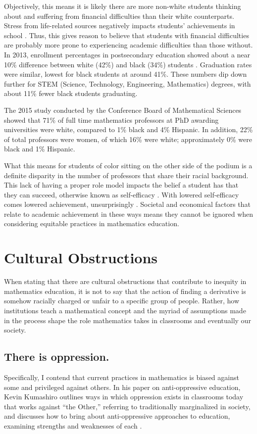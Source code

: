 Objectively, this means it is likely there are more non-white students thinking about and suffering from financial difficulties than their white counterparts. Stress from life-related sources negatively impacts students' achievements in school \citep{andrews_relation_2004}. Thus, this gives reason to believe that students with financial difficulties are probably more prone to experiencing academic difficulties than those without. In 2013, enrollment percentages in postsecondary education showed about a near 10\% difference between white (42\%) and black (34\%) students \citep{musu-gillette_status_nodate}. Graduation rates were similar, lowest for black students at around 41\%. These numbers dip down further for STEM (Science, Technology, Engineering, Mathematics) degrees, with about 11\% fewer black students graduating.

The 2015 study conducted by the Conference Board of Mathematical Sciences showed that 71\% of full time mathematics professors at PhD awarding universities were white, compared to 1\% black and 4\% Hispanic. In addition, 22\% of total professors were women, of which 16\% were white; approximately 0\% were black and 1\% Hispanic.

What this means for students of color sitting on the other side of the podium is a definite disparity in the number of professors that share their racial background. This lack of having a proper role model impacts the belief a student has that they can succeed, otherwise known as self-efficacy \citep{thevenin_mentors_2007}. With lowered self-efficacy comes lowered achievement, unsurprisingly \citep{motlagh_relationship_2011}. Societal and economical factors that relate to academic achievement in these ways means they cannot be ignored when considering equitable practices in mathematics education.

\section{Cultural Obstructions}
When stating that there are cultural obstructions that contribute to inequity in mathematics education, it is not to say that the action of finding a derivative is somehow racially charged or unfair to a specific group of people. Rather, how institutions teach a mathematical concept and the myriad of assumptions made in the process shape the role mathematics takes in classrooms and eventually our society.

\subsection{There is oppression.}
Specifically, I contend that current practices in mathematics is biased against some and privileged against others. In his paper on anti-oppressive education, Kevin Kumashiro outlines ways in which oppression exists in classrooms today that works against ``the Other,'' referring to traditionally marginalized in society, and discusses how to bring about anti-oppressive approaches to education, examining strengths and weaknesses of each \citep{kumashiro_toward_2000}.

